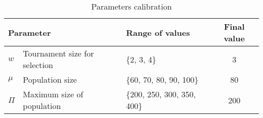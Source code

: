 \begin{table}[!h]
\centering
\begin{tabular}{@{}lllc@{}}
\toprule
\multicolumn{2}{l}{Parameter}           & Range of values             & Final value \\ \midrule
$w$     & Tournament size for selection & \{2, 3, 4\}                 & 3           \\
$\mu$   & Population size               & \{60, 70, 80, 90, 100\}     & 80          \\
$\Pi$   & Maximum size of population    & \{200, 250, 300, 350, 400\} & 200         \\ \bottomrule
\end{tabular}
\caption{Parameters calibration}
\label{calibration}
\end{table}